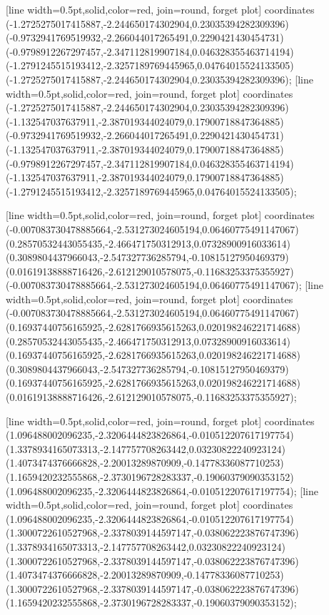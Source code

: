 [line width=0.5pt,solid,color=red, join=round, forget plot] coordinates {(-1.2725275017415887,-2.244650174302904,0.23035394282309396) (-0.9732941769519932,-2.266044017265491,0.2290421430454731) (-0.9798912267297457,-2.347112819907184,0.046328355463714194) (-1.2791245515193412,-2.3257189769445965,0.04764015524133505) (-1.2725275017415887,-2.244650174302904,0.23035394282309396)};
[line width=0.5pt,solid,color=red, join=round, forget plot] coordinates {(-1.2725275017415887,-2.244650174302904,0.23035394282309396) (-1.132547037637911,-2.387019344024079,0.17900718847364885) (-0.9732941769519932,-2.266044017265491,0.2290421430454731) (-1.132547037637911,-2.387019344024079,0.17900718847364885) (-0.9798912267297457,-2.347112819907184,0.046328355463714194) (-1.132547037637911,-2.387019344024079,0.17900718847364885) (-1.2791245515193412,-2.3257189769445965,0.04764015524133505)};

[line width=0.5pt,solid,color=red, join=round, forget plot] coordinates {(-0.007083730478885664,-2.531273024605194,0.06460775491147067) (0.28570532443055435,-2.466471750312913,0.07328900916033614) (0.3089804437966043,-2.547327736285794,-0.10815127950469379) (0.01619138888716426,-2.612129010578075,-0.11683253375355927) (-0.007083730478885664,-2.531273024605194,0.06460775491147067)};
[line width=0.5pt,solid,color=red, join=round, forget plot] coordinates {(-0.007083730478885664,-2.531273024605194,0.06460775491147067) (0.16937440756165925,-2.6281766935615263,0.020198246221714688) (0.28570532443055435,-2.466471750312913,0.07328900916033614) (0.16937440756165925,-2.6281766935615263,0.020198246221714688) (0.3089804437966043,-2.547327736285794,-0.10815127950469379) (0.16937440756165925,-2.6281766935615263,0.020198246221714688) (0.01619138888716426,-2.612129010578075,-0.11683253375355927)};

[line width=0.5pt,solid,color=red, join=round, forget plot] coordinates {(1.096488002096235,-2.3206444823826864,-0.010512207617197754) (1.3378934165073313,-2.147757708263442,0.03230822240923124) (1.4073474376666828,-2.20013289870909,-0.14778336087710253) (1.1659420232555868,-2.3730196728283337,-0.19060379090353152) (1.096488002096235,-2.3206444823826864,-0.010512207617197754)};
[line width=0.5pt,solid,color=red, join=round, forget plot] coordinates {(1.096488002096235,-2.3206444823826864,-0.010512207617197754) (1.3000722610527968,-2.3378039144597147,-0.038062223876747396) (1.3378934165073313,-2.147757708263442,0.03230822240923124) (1.3000722610527968,-2.3378039144597147,-0.038062223876747396) (1.4073474376666828,-2.20013289870909,-0.14778336087710253) (1.3000722610527968,-2.3378039144597147,-0.038062223876747396) (1.1659420232555868,-2.3730196728283337,-0.19060379090353152)};

